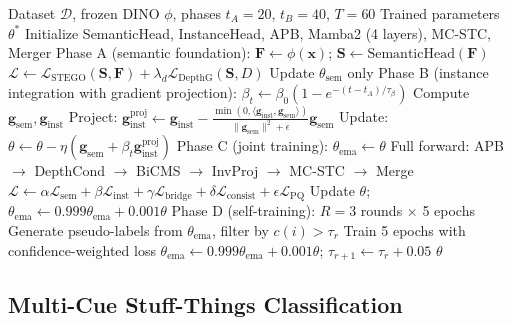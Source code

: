 \documentclass[10pt,twocolumn,letterpaper]{article}
\newcommand{\lsem}{\mathcal{L}_{\text{sem}}}
\newcommand{\linst}{\mathcal{L}_{\text{inst}}}
\newcommand{\lbridge}{\mathcal{L}_{\text{bridge}}}
\newcommand{\lconsist}{\mathcal{L}_{\text{consist}}}
\newcommand{\lpq}{\mathcal{L}_{\text{PQ}}}
\begin{document}
\begin{algorithm}[H]
\caption{MBPS Training Pipeline}
\label{alg:mbps_train}
\begin{algorithmic}[1]
\REQUIRE Dataset $\mathcal{D}$, frozen DINO $\phi$, phases $t_A{=}20$, $t_B{=}40$, $T{=}60$
\ENSURE Trained parameters $\theta^*$
\STATE Initialize SemanticHead, InstanceHead, APB, Mamba2 (4 layers), MC-STC, Merger
\STATE Phase A (semantic foundation):
        \STATE $\mathbf{F} \leftarrow \phi(\mathbf{x})$; $\mathbf{S} \leftarrow \text{SemanticHead}(\mathbf{F})$
        \STATE $\mathcal{L} \leftarrow \mathcal{L}_{\text{STEGO}}(\mathbf{S}, \mathbf{F}) + \lambda_d \mathcal{L}_{\text{DepthG}}(\mathbf{S}, D)$
        \STATE Update $\theta_{\text{sem}}$ only
    \ENDFOR
\ENDFOR
\STATE Phase B (instance integration with gradient projection):
    \STATE $\beta_t \leftarrow \beta_0(1 - e^{-(t-t_A)/\tau_\beta})$
        \STATE Compute $\mathbf{g}_{\text{sem}}, \mathbf{g}_{\text{inst}}$
        \STATE Project: $\mathbf{g}_{\text{inst}}^{\text{proj}} \leftarrow \mathbf{g}_{\text{inst}} - \frac{\min(0, \langle \mathbf{g}_{\text{inst}}, \mathbf{g}_{\text{sem}} \rangle)}{\|\mathbf{g}_{\text{sem}}\|^2 + \epsilon} \mathbf{g}_{\text{sem}}$
        \STATE Update: $\theta \leftarrow \theta - \eta(\mathbf{g}_{\text{sem}} + \beta_t \mathbf{g}_{\text{inst}}^{\text{proj}})$
    \ENDFOR
\ENDFOR
\STATE Phase C (joint training): $\theta_{\text{ema}} \leftarrow \theta$
        \STATE Full forward: APB $\to$ DepthCond $\to$ BiCMS $\to$ InvProj $\to$ MC-STC $\to$ Merge
        \STATE $\mathcal{L} \leftarrow \alpha\lsem + \beta\linst + \gamma\lbridge + \delta\lconsist + \epsilon\lpq$
        \STATE Update $\theta$; $\theta_{\text{ema}} \leftarrow 0.999 \theta_{\text{ema}} + 0.001 \theta$
    \ENDFOR
\ENDFOR
\STATE Phase D (self-training): $R{=}3$ rounds $\times$ 5 epochs
    \STATE Generate pseudo-labels from $\theta_{\text{ema}}$, filter by $c(i) > \tau_r$
    \STATE Train 5 epochs with confidence-weighted loss
    \STATE $\theta_{\text{ema}} \leftarrow 0.999 \theta_{\text{ema}} + 0.001 \theta$; $\tau_{r+1} \leftarrow \tau_r + 0.05$
\ENDFOR
\RETURN $\theta$
\end{algorithmic}
\end{algorithm}


\subsection{Multi-Cue Stuff-Things Classification}
\end{document}
